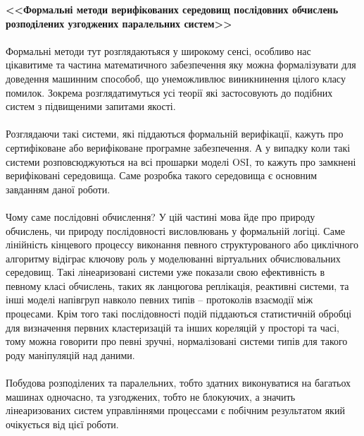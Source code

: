 \documentclass[11pt,oneside]{article}
\begin{document}
   {\bf <<Формальні методи верифікованих середовищ послідовних
          обчислень розподілених узгоджених паралельних систем>>}

\vspace{0.5cm}

   \paragraph{}
   Формальні методи тут розглядаютьяся у широкому сенсі, особливо нас цікавитиме
   та частина математичного забезпечення яку можна формалізувати для доведення
   машинним способоб, що унеможливлює виникнинення цілого класу помилок.
   Зокрема розглядатимуться усі теорії які застосовують до подібних систем
   з підвищеними запитами якості.

   \paragraph{}
   Розглядаючи такі системи, які піддаються формальній верифікації, кажуть про
   сертифіковане або верифіковане програмне забезпечення. А у випадку коли такі
   системи розповсюджуються на всі прошарки моделі OSI, то кажуть про замкнені
   верифіковані середовища. Саме розробка такого середовища є основним завданням даної роботи.

   \paragraph{}
   Чому саме послідовні обчислення? У цій частині мова йде про природу обчислень,
   чи природу послідовності висловлювань у формальній логіці. Саме лінійність кінцевого
   процессу виконання певного структурованого або циклічного алгоритму відіграє ключову
   роль у моделюванні віртуальних обчислювальних середовищ. Такі лінеаризовані системи
   уже показали свою ефективність в певному класі обчислень, таких як ланцюгова реплікація,
   реактивні системи, та інші моделі напівгруп навколо певних типів -- протоколів взаємодії між процесами.
   Крім того такі послідовності подій піддаються статистичній обробці для визначення первних кластеризацій
   та інших кореляцій у просторі та часі, тому можна говорити про певні зручні, нормалізовані системи типів для
   такого роду маніпуляцій над даними.

   \paragraph{}
   Побудова розподілених та паралельних, тобто здатних виконуватися на багатьох машинах одночасно, та
   узгоджених, тобто не блокуючих, а значить лінеаризованих систем управліннями процессами є побічним
   результатом який очікується від цієї роботи.
\end{document}
